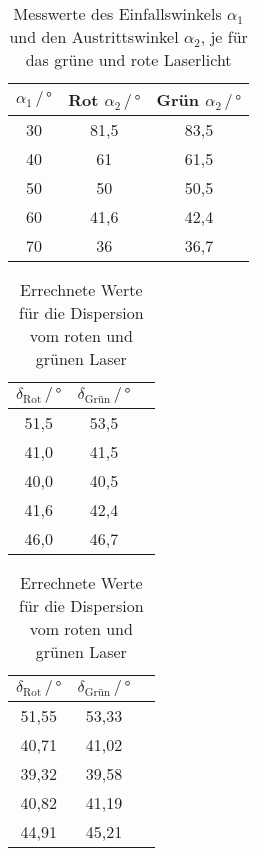 \begin{table}
    \centering
    \caption{Messwerte des Einfallswinkels $\alpha_1$ und den Austrittswinkel $\alpha_2$, je für das grüne und rote Laserlicht}
    \label{tab:las}
    \begin{tabular}{c c c}
    \toprule
         $\alpha_1 \, / \, ° $ & Rot $\alpha_2 \, / \, °$ & Grün $\alpha_2 \, / \, °$\\
    \midrule
    30 & 81,5 & 83,5 \\
    40 & 61   & 61,5 \\
    50 & 50   & 50,5 \\
    60 & 41,6 & 42,4 \\
    70 & 36   & 36,7 \\
    \bottomrule
    \end{tabular}
\end{table}

\begin{table}
    \centering
    \caption{Errechnete Werte für die Dispersion vom roten und grünen Laser}
    \label{tab:dis}
    \begin{tabular}{c c c}
    \toprule
         $\delta_\text{Rot} \, / \, ° $ & $\delta_\text{Grün} \, / \, °$\\
    \midrule
    51,5 &  53,5 \\
    41,0 &  41,5 \\
    40,0 &  40,5 \\
    41,6 &  42,4 \\
    46,0 &  46,7 \\ 
    \bottomrule
    \end{tabular}
\end{table}

\begin{table}
    \centering
    \caption{Errechnete Werte für die Dispersion vom roten und grünen Laser}
    \label{tab:dis2}
    \begin{tabular}{c c c}
    \toprule
         $\delta_\text{Rot} \, / \, ° $ & $\delta_\text{Grün} \, / \, °$\\
    \midrule
    51,55 &  53,33 \\
    40,71 &  41,02 \\
    39,32 &  39,58 \\
    40,82 &  41,19 \\
    44,91 &  45,21 \\ 
    \bottomrule
    \end{tabular}
\end{table}

